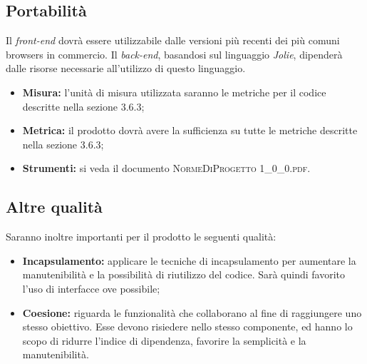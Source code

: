 	\subsection{Portabilità}
		Il \textit{front-end} dovrà essere utilizzabile dalle versioni più recenti dei più comuni browsers in commercio. 
		Il \textit{back-end}, basandosi sul linguaggio \textit{Jolie}, dipenderà dalle risorse necessarie all’utilizzo di questo linguaggio.
		
		\begin{itemize}
			\item \textbf{Misura: }l’unità di misura utilizzata saranno le metriche per il codice descritte nella sezione 3.6.3;
			\item \textbf{Metrica: }il prodotto dovrà avere la sufficienza su tutte le metriche descritte nella sezione 3.6.3;
			\item \textbf{Strumenti: }si veda il documento \textsc{NormeDiProgetto 1\_0\_0.pdf}.
			
		\end{itemize}
	
	\subsection{Altre qualità}
		Saranno inoltre importanti per il prodotto le seguenti qualità:
		
		\begin{itemize}
			\item \textbf{Incapsulamento: }applicare le tecniche di incapsulamento per aumentare la manutenibilità
			e la possibilità di riutilizzo del codice. Sarà quindi favorito l’uso di interfacce ove
			possibile;
			\item \textbf{Coesione: }riguarda le funzionalità che collaborano al fine di raggiungere uno stesso obiettivo. Esse devono risiedere nello stesso componente, ed hanno lo scopo di ridurre l’indice di dipendenza, favorire la semplicità e la manutenibilità.
			
		\end{itemize}
		
	
	
	